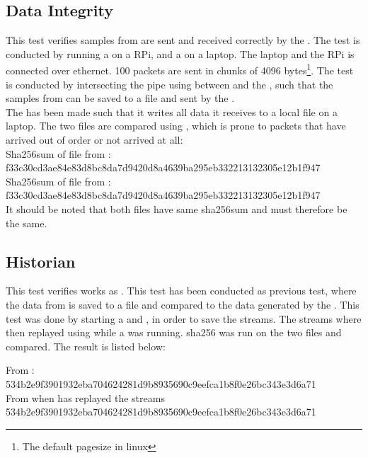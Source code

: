 \subsection{Data Integrity} \label{sec:verify:dataintegrity}
This test verifies samples from  are sent and received correctly by the \con{}.
The test is conducted by running a \pub{} on a \ac{RPi}, and a \sub{} on a laptop. The laptop and the \ac{RPi} is connected over ethernet. 100 packets are sent in chunks of 4096 bytes\footnote{The default pagesize in linux}. The test is conducted by intersecting the pipe using  between  and the , such that the samples from  can be saved to a file and sent by the \pub{}.\\

\noindent The \con{} has been made such that it writes all data it receives to a local file on a laptop. 
The two files are compared using , which is prone to packets that have arrived out of order or not arrived at all: \\
\noindent{}Sha256sum of file from \pub{}:\\
f33c30cd3ae84e83d8bc8da7d9420d8a4639ba295eb332213132305e12b1f947 \\
\noindent{}Sha256sum of file from \sub{}:\\
f33c30cd3ae84e83d8bc8da7d9420d8a4639ba295eb332213132305e12b1f947  \\

\noindent It should be noted that both files have same sha256sum and must therefore be the same.

\subsection{Historian}
This test verifies  works as \hist{}. This test has been conducted as previous test, where the data from  is saved to a file and compared to the data generated by the \con{}. This test was done by starting a \pub{} and , in order to save the streams. The streams where then replayed using  while a \sub{} was running. sha256 was run on the two files and compared. The result is listed below:

\noindent{}From \pub{}: \\
534b2e9f3901932eba704624281d9b8935690c9eefca1b8f0e26bc343e3d6a71\\
\noindent{}From \con{} when  has replayed the streams\\
534b2e9f3901932eba704624281d9b8935690c9eefca1b8f0e26bc343e3d6a71\\

